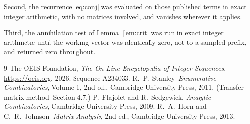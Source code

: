 \documentclass[11pt,a4paper]{article}
\theoremstyle{plain}
\theoremstyle{definition}
\begin{document}
Second, the recurrence \eqref{eq:conj} was evaluated on those published terms in exact
integer arithmetic, with no matrices involved, and vanishes wherever it applies.

Third, the annihilation test of Lemma~\ref{lem:crit} was run in exact integer arithmetic
until the working vector was identically zero, not to a sampled prefix, and returned zero
throughout.

\begin{thebibliography}{9}
 The OEIS Foundation, \emph{The On-Line Encyclopedia of Integer
Sequences}, \url{https://oeis.org}, 2026. Sequence A234033.
 R.~P.~Stanley, \emph{Enumerative Combinatorics}, Volume 1, 2nd ed.,
Cambridge University Press, 2011. (Transfer-matrix method, Section 4.7.)
 P.~Flajolet and R.~Sedgewick, \emph{Analytic Combinatorics}, Cambridge
University Press, 2009.
 R.~A.~Horn and C.~R.~Johnson, \emph{Matrix Analysis}, 2nd ed., Cambridge
University Press, 2013.
\end{thebibliography}
\end{document}
